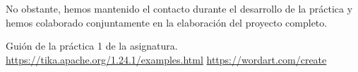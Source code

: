 \documentclass[12pt]{article}
\begin{document}
No obstante, hemos mantenido el contacto durante el desarrollo de la práctica y hemos colaborado conjuntamente en la elaboración del proyecto completo.

\patchcmd{\thebibliography}{\section*}{\section}{}{}
\begin{thebibliography}{}
 Guión de la práctica 1 de la asignatura.
 \url{https://tika.apache.org/1.24.1/examples.html}
 \url{https://wordart.com/create}
\end{thebibliography}
\end{document}
